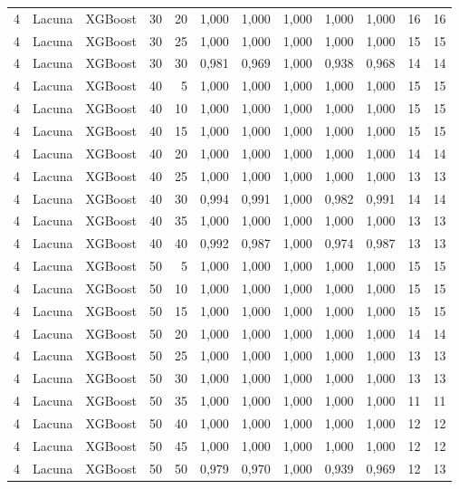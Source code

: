 \begin{longtable}{@{}rllrrrrrrrrr@{}}
4 & Lacuna & XGBoost & 30 & 20 & 1,000 & 1,000 & 1,000 & 1,000 & 1,000 & 16 & 16 \\
4 & Lacuna & XGBoost & 30 & 25 & 1,000 & 1,000 & 1,000 & 1,000 & 1,000 & 15 & 15 \\
4 & Lacuna & XGBoost & 30 & 30 & 0,981 & 0,969 & 1,000 & 0,938 & 0,968 & 14 & 14 \\
4 & Lacuna & XGBoost & 40 & 5 & 1,000 & 1,000 & 1,000 & 1,000 & 1,000 & 15 & 15 \\
4 & Lacuna & XGBoost & 40 & 10 & 1,000 & 1,000 & 1,000 & 1,000 & 1,000 & 15 & 15 \\
4 & Lacuna & XGBoost & 40 & 15 & 1,000 & 1,000 & 1,000 & 1,000 & 1,000 & 15 & 15 \\
4 & Lacuna & XGBoost & 40 & 20 & 1,000 & 1,000 & 1,000 & 1,000 & 1,000 & 14 & 14 \\
4 & Lacuna & XGBoost & 40 & 25 & 1,000 & 1,000 & 1,000 & 1,000 & 1,000 & 13 & 13 \\
4 & Lacuna & XGBoost & 40 & 30 & 0,994 & 0,991 & 1,000 & 0,982 & 0,991 & 14 & 14 \\
4 & Lacuna & XGBoost & 40 & 35 & 1,000 & 1,000 & 1,000 & 1,000 & 1,000 & 13 & 13 \\
4 & Lacuna & XGBoost & 40 & 40 & 0,992 & 0,987 & 1,000 & 0,974 & 0,987 & 13 & 13 \\
4 & Lacuna & XGBoost & 50 & 5 & 1,000 & 1,000 & 1,000 & 1,000 & 1,000 & 15 & 15 \\
4 & Lacuna & XGBoost & 50 & 10 & 1,000 & 1,000 & 1,000 & 1,000 & 1,000 & 15 & 15 \\
4 & Lacuna & XGBoost & 50 & 15 & 1,000 & 1,000 & 1,000 & 1,000 & 1,000 & 15 & 15 \\
4 & Lacuna & XGBoost & 50 & 20 & 1,000 & 1,000 & 1,000 & 1,000 & 1,000 & 14 & 14 \\
4 & Lacuna & XGBoost & 50 & 25 & 1,000 & 1,000 & 1,000 & 1,000 & 1,000 & 13 & 13 \\
4 & Lacuna & XGBoost & 50 & 30 & 1,000 & 1,000 & 1,000 & 1,000 & 1,000 & 13 & 13 \\
4 & Lacuna & XGBoost & 50 & 35 & 1,000 & 1,000 & 1,000 & 1,000 & 1,000 & 11 & 11 \\
4 & Lacuna & XGBoost & 50 & 40 & 1,000 & 1,000 & 1,000 & 1,000 & 1,000 & 12 & 12 \\
4 & Lacuna & XGBoost & 50 & 45 & 1,000 & 1,000 & 1,000 & 1,000 & 1,000 & 12 & 12 \\
4 & Lacuna & XGBoost & 50 & 50 & 0,979 & 0,970 & 1,000 & 0,939 & 0,969 & 12 & 13 \\

\end{longtable}
